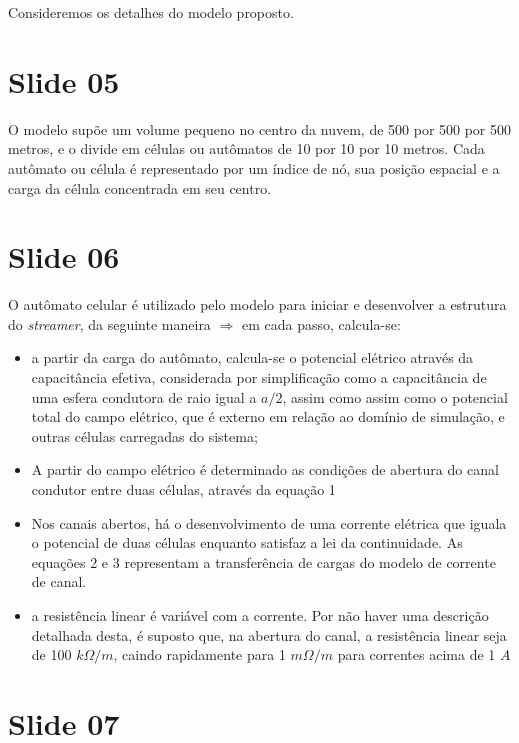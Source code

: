 \documentclass[a4paper, 12pt, onecolumn,singlespacing]{article}
\begin{document}
	Consideremos os detalhes do modelo proposto.
	
	\section{Slide 05}
	
	O modelo supõe um volume pequeno no centro da nuvem, de 500 por 500 por 500 metros, e o divide em células ou autômatos de 10 por 10 por 10 metros. Cada autômato ou célula é representado por um índice de nó, sua posição espacial e a carga da célula concentrada em seu centro.
	
	\section{Slide 06}
	
	O autômato celular é utilizado pelo modelo para iniciar e desenvolver a estrutura do \textit{streamer}, da seguinte maneira $\Rightarrow$ em cada passo, calcula-se:
	
	\begin{itemize}
		\item a partir da carga do autômato, calcula-se o potencial elétrico através da capacitância efetiva, considerada por simplificação como a capacitância de uma esfera condutora de raio igual a $a/2$, assim como assim como o potencial total do campo elétrico, que é externo em relação ao domínio de simulação, e outras células carregadas do sistema;
		\item A partir do campo elétrico é determinado as condições de abertura do canal condutor entre duas células, através da equação 1
		\item Nos canais abertos, há o desenvolvimento de uma corrente elétrica que iguala o potencial de duas células enquanto satisfaz a lei da continuidade. As equações 2 e 3 representam a transferência de cargas do modelo de corrente de canal. 
		\item a resistência linear é variável com a corrente. Por não haver uma descrição detalhada desta, é suposto que, na abertura do canal, a resistência linear seja de 100 $k\Omega/m$, caindo rapidamente para 1 $m\Omega/m$ para correntes acima de 1 $A$
		
	\end{itemize}
	
	\section{Slide 07}
\end{document}
